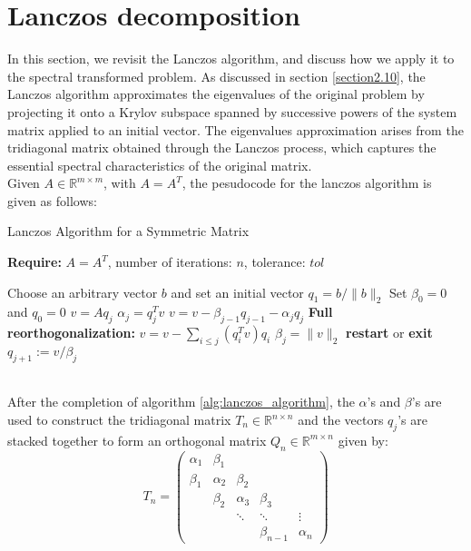 \section{Lanczos decomposition}
In this section, we revisit the Lanczos algorithm, and discuss how we apply it to the spectral transformed problem. As discussed in section \ref{section2.10}, the Lanczos algorithm approximates the eigenvalues of the original problem by projecting it onto a Krylov subspace spanned by successive powers of the system matrix applied to an initial vector. The eigenvalues approximation arises from the tridiagonal matrix obtained through the Lanczos process, which captures the essential spectral characteristics of the original matrix.\\
Given $A \in \mathbb{R}^{m \times m}$, with $A=A^T$, the pesudocode for the lanczos algorithm is given as follows:
\begin{algorithm}
	\caption{Lanczos Algorithm for a Symmetric Matrix}
	\label{alg:lanczos_algorithm}

	\textbf{Require:} \( A = A^T \), number of iterations: \(n\), tolerance: \(tol\)
	\begin{algorithmic}[1]
		\State Choose an arbitrary vector $b$ and set an initial vector $q_1 = b/ \|b\|_2$ 
		\State Set $\beta_0 = 0$ and $q_0 = 0$
		\State $v = A q_j$
		\State $\alpha_j = q_j^T v $
		\State $v = v - \beta_{j-1}q_{j-1} - \alpha_j q_j$
		\State \textbf{Full reorthogonalization:} $v = v - \sum_{i \leq j} (q_i^T v) q_i$
		\State $\beta_{j} = \|v\|_2$
		\State \textbf{restart} or \textbf{exit}
		\EndIf
		\State $q_{j+1} := v / \beta_{j}$
		\EndFor
		\EndFunction
	\end{algorithmic}
\end{algorithm}\\
After the completion of algorithm \ref{alg:lanczos_algorithm}, the $\alpha$'s and $\beta$'s are used to construct the tridiagonal matrix $T_n \in \mathbb{R}^{n \times n}$ and the vectors $q_j$'s are stacked together to form an orthogonal matrix $Q_n \in \mathbb{R}^{m \times n}$ given by:
\[T_n = \begin{pmatrix}
			\alpha_1 & \beta_1 & & & \\\beta_1 & \alpha_2 & \beta_2 & & \\ & \beta_2 & \alpha_3 & \beta_3 & \\ & & \ddots & \ddots & \vdots \\ & & & \beta_{n-1} & \alpha_n
		\end{pmatrix}\] 
